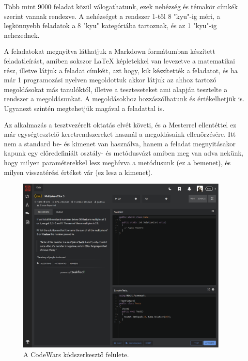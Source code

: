 Több mint 9000 feladat közül válogathatunk, ezek nehézség és témakör címkék szerint vannak rendezve. A nehézséget a rendszer 1-től 8 "kyu"-ig méri, a legkönnyebb feladatok a 8 "kyu" kategóriába tartoznak, és az 1 "kyu"-ig nehezednek.

A feladatokat megnyitva láthatjuk a Markdown formátumban készített feladatleírást, amiben sokszor \LaTeX{} képletekkel van levezetve a matematikai rész, illetve látjuk a feladat címkéit, azt hogy, kik készítették a feladatot, és ha már 1 programozási nyelven megoldottuk akkor látjuk az ahhoz tartozó megoldásokat más tanulóktól, illetve a teszteseteket ami alapján tesztelte a rendszer a megoldásunkat.
A megoldásokhoz hozzászólhatunk és értékelhetjük is. Ugyanezt szintén megtehetjük magával a feladattal is.

Az alkalmazás a tesztvezérelt oktatás elvét követi, és a Mesterrel ellentéttel ez már egységtesztelő keretrendszereket használ a megoldásaink ellenőrzésére. Itt nem a standard be- és kimenet van használva, hanem a feladat megnyitásakor kapunk egy előredefiniált osztály- és metódusvázt amiben meg van adva nekünk, hogy milyen paraméterekkel lesz meghívva a metódusunk (ez a bemenet), és milyen visszatérési értéket vár (ez lesz a kimenet).

\begin{figure}[h]
    \centering
    \includegraphics[width=0.95\textwidth]{images/codewars_editor.png}
    \caption{A CodeWars kódszerkesztő felülete.}
    \label{fig:codewars_editor}
\end{figure}

